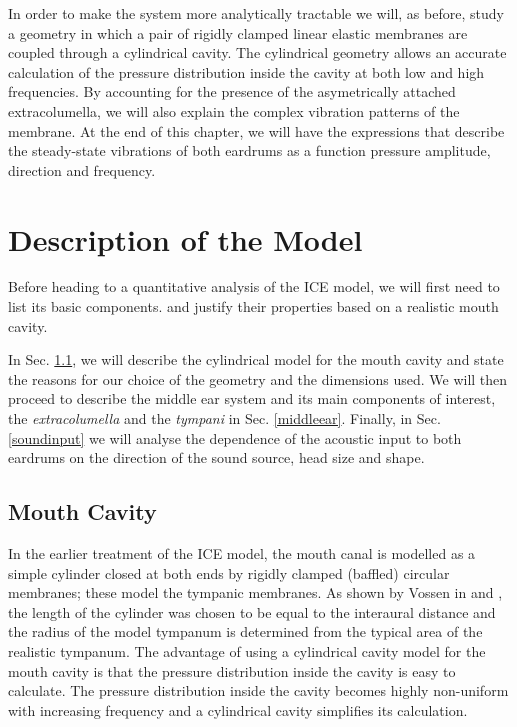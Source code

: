 In order to make the system more analytically tractable we will, as before, study a geometry in which a pair of rigidly clamped
linear elastic membranes are coupled through a cylindrical cavity. The cylindrical geometry allows an accurate calculation of the 
pressure distribution inside the cavity at both low and high frequencies. By accounting for the presence of the asymetrically attached
extracolumella, we will also explain the complex vibration patterns of the membrane. At the end of this chapter, we will
have the expressions that describe the steady-state vibrations of both eardrums as a function pressure amplitude, direction and frequency.

\section{Description of the Model}\label{description}
Before heading to a quantitative analysis of the ICE model, we will first need to list its basic components. 
and justify their properties based on a realistic mouth cavity. 

In Sec. \ref{subsecinnercavity}, we will describe the cylindrical model for the mouth cavity and state the reasons
for our choice of the geometry and the dimensions used. We will then proceed to describe the middle
ear system and its main components of interest, the \textit{extracolumella} and the \textit{tympani}
in Sec. \ref{middleear}. Finally, in Sec. \ref{soundinput} we will analyse the dependence of the acoustic input to both
eardrums on the direction of the sound source, head size and shape. 
\subsection{Mouth Cavity}\label{subsecinnercavity}
In the earlier treatment of the ICE model, the mouth canal is modelled as a simple cylinder closed at 
both ends by rigidly clamped (baffled) circular membranes; these model the tympanic membranes. As shown 
by Vossen in \cite[p.~21]{vossenthesis} and \cite{vossenjasa}, the length of the cylinder was chosen to be equal to the interaural distance and the radius of the model tympanum is
determined from the typical area of the realistic tympanum. The advantage of using a cylindrical cavity model for the mouth cavity is that the pressure
distribution inside the cavity is easy to calculate. The pressure distribution inside the cavity becomes highly non-uniform 
with increasing frequency and a cylindrical cavity simplifies its calculation. 

